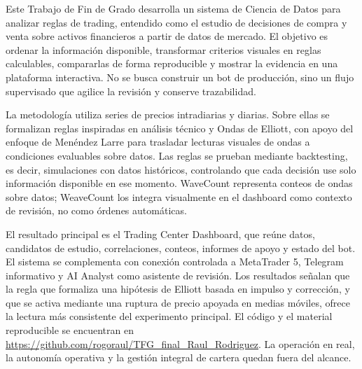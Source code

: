 \documentclass[twoside,spanish,a4paper,12pt]{tfg}
\makeatletter
\renewcommand{\cleardoublepage}{%
  \clearpage
  \if@twoside
    \ifodd\c@page
    \else
      \thispagestyle{empty}%
      \hbox{}%
      \newpage
      \if@twocolumn\hbox{}\newpage\fi
    \fi
  \fi
}
\makeatother
\begin{document}
{}
\begin{resumen}
Este Trabajo de Fin de Grado desarrolla un sistema de Ciencia de Datos para
analizar reglas de trading, entendido como el estudio de decisiones de compra y
venta sobre activos financieros a partir de datos de mercado. El objetivo es
ordenar la informaci\'on disponible, transformar criterios visuales en reglas
calculables, compararlas de forma reproducible y mostrar la evidencia en una
plataforma interactiva. No se busca construir un bot de producci\'on, sino un
flujo supervisado que agilice la revisi\'on y conserve trazabilidad.

La metodolog\'ia utiliza series de precios intradiarias y diarias. Sobre ellas se
formalizan reglas inspiradas en an\'alisis t\'ecnico y Ondas de Elliott, con apoyo
del enfoque de Men\'endez Larre para trasladar lecturas visuales de ondas a
condiciones evaluables sobre datos. Las reglas se prueban mediante backtesting,
es decir, simulaciones con datos hist\'oricos, controlando que cada decisi\'on use
solo informaci\'on disponible en ese momento. WaveCount representa conteos de
ondas sobre datos; WeaveCount los integra visualmente en el dashboard como
contexto de revisi\'on, no como \'ordenes autom\'aticas.

El resultado principal es el Trading Center Dashboard, que re\'une datos,
candidatos de estudio, correlaciones, conteos, informes de apoyo y estado del
bot. El sistema se complementa con conexi\'on controlada a MetaTrader 5, Telegram
informativo y AI Analyst como asistente de revisi\'on. Los resultados se\~nalan que
la regla que formaliza una hip\'otesis de Elliott basada en impulso y correcci\'on,
y que se activa mediante una ruptura de precio apoyada en medias m\'oviles,
ofrece la lectura m\'as consistente del experimento principal. El c\'odigo y el
material reproducible se encuentran en
\url{https://github.com/rogoraul/TFG_final_Raul_Rodriguez}. La operaci\'on en
real, la autonom\'ia operativa y la gesti\'on integral de cartera quedan fuera del
alcance.
\end{resumen}
\cleardoublepage
\end{document}
